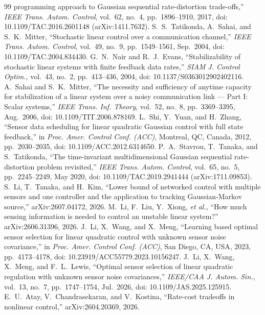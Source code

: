 \documentclass[journal]{IEEEtran}
\theoremstyle{remark}
\begin{document}
\begin{thebibliography}{99}
programming approach to Gaussian sequential rate-distortion trade-offs,''
\emph{IEEE Trans. Autom. Control}, vol.~62, no.~4, pp.~1896--1910, 2017,
doi: 10.1109/TAC.2016.2601148 (arXiv:1411.7632).
S.~S.~Tatikonda, A.~Sahai, and S.~K.~Mitter, ``Stochastic linear control over a
communication channel,'' \emph{IEEE Trans. Autom. Control}, vol.~49, no.~9,
pp.~1549--1561, Sep.~2004, doi: 10.1109/TAC.2004.834430.
G.~N.~Nair and R.~J.~Evans, ``Stabilizability of stochastic linear systems with
finite feedback data rates,'' \emph{SIAM J. Control Optim.}, vol.~43, no.~2,
pp.~413--436, 2004, doi: 10.1137/S0363012902402116.
A.~Sahai and S.~K.~Mitter, ``The necessity and sufficiency of anytime capacity for
stabilization of a linear system over a noisy communication link --- Part I: Scalar
systems,'' \emph{IEEE Trans. Inf. Theory}, vol.~52, no.~8, pp.~3369--3395,
Aug.~2006, doi: 10.1109/TIT.2006.878169.
L.~Shi, Y.~Yuan, and H.~Zhang, ``Sensor data scheduling for linear quadratic
Gaussian control with full state feedback,'' in \emph{Proc. Amer. Control Conf.
(ACC)}, Montreal, QC, Canada, 2012, pp.~2030--2035, doi: 10.1109/ACC.2012.6314650.
P.~A.~Stavrou, T.~Tanaka, and S.~Tatikonda, ``The time-invariant multidimensional
Gaussian sequential rate-distortion problem revisited,'' \emph{IEEE Trans. Autom.
Control}, vol.~65, no.~5, pp.~2245--2249, May 2020, doi: 10.1109/TAC.2019.2941444
(arXiv:1711.09853).
S.~Li, T.~Tanaka, and H.~Kim, ``Lower bound of networked control with multiple
sensors and one controller and the application to tracking Gaussian-Markov
source,'' arXiv:2607.04172, 2026.
M.~Li, F.~Liu, Y.~Xiong, \emph{et al.}, ``How much sensing information is needed
to control an unstable linear system?'' arXiv:2606.31396, 2026.
J.~Li, X.~Wang, and X.~Meng, ``Learning based optimal sensor selection for linear
quadratic control with unknown sensor noise covariance,'' in \emph{Proc. Amer.
Control Conf. (ACC)}, San Diego, CA, USA, 2023, pp.~4173--4178, doi:
10.23919/ACC55779.2023.10156247.
J.~Li, X.~Wang, X.~Meng, and F.~L.~Lewis, ``Optimal sensor selection of linear
quadratic regulation with unknown sensor noise covariances,'' \emph{IEEE/CAA J.
Autom. Sin.}, vol.~13, no.~7, pp.~1747--1754, Jul.~2026, doi: 10.1109/JAS.2025.125915.
E.~U.~Atay, V.~Chandrasekaran, and V.~Kostina, ``Rate-cost tradeoffs in nonlinear
control,'' arXiv:2604.20369, 2026.

\end{thebibliography}
\end{document}
